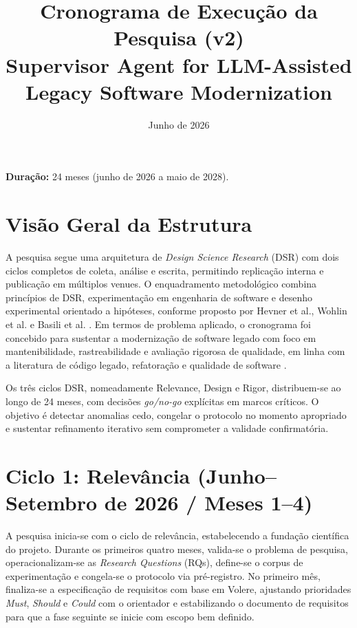 \documentclass[12pt,a4paper]{article}
\title{Cronograma de Execução da Pesquisa (v2)\\
\large Supervisor Agent for LLM-Assisted Legacy Software Modernization}
\author{}
\date{Junho de 2026}
\begin{document}
\maketitle

\noindent\textbf{Duração:} 24 meses (junho de 2026 a maio de 2028).

\section*{Visão Geral da Estrutura}

A pesquisa segue uma arquitetura de \textit{Design Science Research} (DSR) com dois ciclos completos de coleta, análise e escrita, permitindo replicação interna e publicação em múltiplos venues. O enquadramento metodológico combina princípios de DSR, experimentação em engenharia de software e desenho experimental orientado a hipóteses, conforme proposto por Hevner et al., Wohlin et al. e Basili et al. \cite{hevner2004, wohlin2012, basili1986}. Em termos de problema aplicado, o cronograma foi concebido para sustentar a modernização de software legado com foco em mantenibilidade, rastreabilidade e avaliação rigorosa de qualidade, em linha com a literatura de código legado, refatoração e qualidade de software \cite{feathers2004, fowler1999, seacord2003, iso25010}.

Os três ciclos DSR, nomeadamente Relevance, Design e Rigor, distribuem-se ao longo de 24 meses, com decisões \textit{go/no-go} explícitas em marcos críticos. O objetivo é detectar anomalias cedo, congelar o protocolo no momento apropriado e sustentar refinamento iterativo sem comprometer a validade confirmatória.

\section*{Ciclo 1: Relevância (Junho--Setembro de 2026 / Meses 1--4)}

A pesquisa inicia-se com o ciclo de relevância, estabelecendo a fundação científica do projeto. Durante os primeiros quatro meses, valida-se o problema de pesquisa, operacionalizam-se as \textit{Research Questions} (RQs), define-se o corpus de experimentação e congela-se o protocolo via pré-registro. No primeiro mês, finaliza-se a especificação de requisitos com base em Volere, ajustando prioridades \textit{Must}, \textit{Should} e \textit{Could} com o orientador e estabilizando o documento de requisitos para que a fase seguinte se inicie com escopo bem definido.
\end{document}
